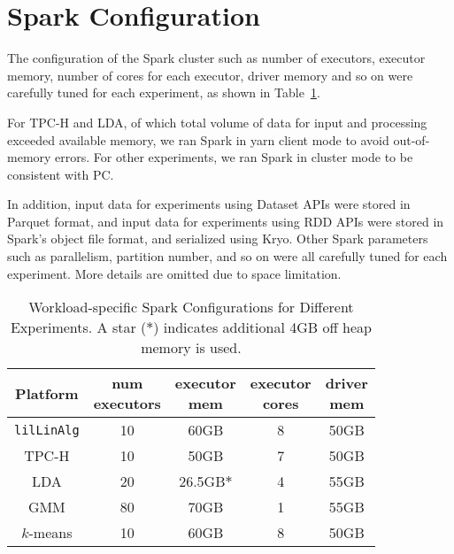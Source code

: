 \section{Spark Configuration}
\label{sec:spark}

The configuration of the Spark cluster such as number of
executors, executor memory, number of cores for each executor, driver
memory and so on were carefully tuned for each
experiment, as shown in Table~\ref{fig:sparkConf}.

For TPC-H and LDA, of which total volume of data for input and
processing exceeded available memory, we ran Spark in yarn client
mode to avoid out-of-memory errors. For other experiments, we ran Spark
in cluster mode to be consistent with PC.

In addition, input data for experiments
using Dataset APIs were stored in Parquet format, and input data for
experiments using RDD APIs were stored in Spark's object file format,
and serialized using Kryo. Other Spark parameters such as parallelism,
partition number, and so on were all carefully tuned for each experiment. More details
are omitted due to space limitation.

\begin{table}[H]
\begin{center}
\begin{tabular}{|c||c|c|c|c|}
\hline
Platform & \makecell{num\\executors} & \makecell{executor \\mem} & \makecell{executor \\cores}& \makecell{driver \\mem}\\
\hline
\texttt{lilLinAlg} &10 & 60GB & 8 & 50GB \\
TPC-H &10 & 50GB & 7 & 50GB \\
LDA &20 & 26.5GB$*$ &4 & 55GB\\
GMM&80 & 70GB & 1 & 55GB\\
$k$-means &10 &60GB & 8 & 50GB\\
\hline
\end{tabular}
\caption{Workload-specific Spark Configurations for Different
  Experiments. A star ($*$) indicates additional 4GB off heap memory is used.}
\label{fig:sparkConf}
\end{center}
\end{table}
